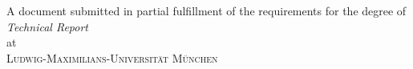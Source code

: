\begin{titlepage}
  \vspace*{5cm}
  \makeatletter
  \begin{center}
    \begin{Huge}
      \@title
    \end{Huge}\\[0.1cm]
    \begin{Large}
      \@subtitle
    \end{Large}\\[1em]
    \@author
    \vfill
    A document submitted in partial fulfillment
    of the requirements for the degree of\\
    \emph{Technical Report}\\
    at\\
    \textsc{Ludwig-Maximilians-Universität München}
  \end{center}
  \makeatother
\end{titlepage}

\newpage
\null
\thispagestyle{empty}
\newpage
